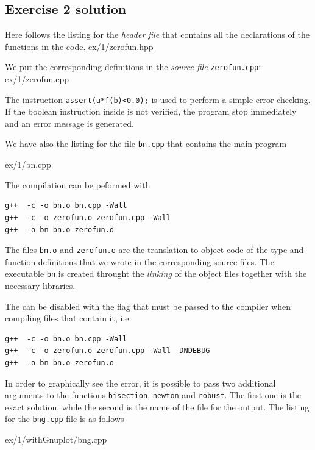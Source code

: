 \subsection*{Exercise 2 solution}

Here follows the listing for the \emph{header file} that contains all the
declarations of the functions in the code.
\lstset{basicstyle=\scriptsize\sf}
     {ex/1/zerofun.hpp}
\lstset{basicstyle=\sf}

We put the corresponding definitions in the \emph{source file}
\texttt{zerofun.cpp}:
\lstset{basicstyle=\scriptsize\sf}
     {ex/1/zerofun.cpp}
\lstset{basicstyle=\sf}

The instruction \texttt{assert(u*f(b)<0.0);} is used to perform a simple error
checking. If the boolean instruction inside is not verified, the program stop
immediately and an error message is generated.

We have also the listing for the file \texttt{bn.cpp} that contains the main
program
\lstset{basicstyle=\scriptsize\sf}
    
    {ex/1/bn.cpp}
\lstset{basicstyle=\sf}

The compilation can be peformed with
\begin{verbatim}
g++  -c -o bn.o bn.cpp -Wall
g++  -c -o zerofun.o zerofun.cpp -Wall
g++  -o bn bn.o zerofun.o
\end{verbatim}

The files \texttt{bn.o} and \texttt{zerofun.o} are the translation to object
code of the type and function definitions that we wrote in the corresponding
source files. The executable \texttt{bn} is created throught the \emph{linking}
of the object files together with the necessary libraries.

The  can be disabled with the  flag that must be
passed to the compiler when compiling files that contain it, i.e.
\begin{verbatim}
g++  -c -o bn.o bn.cpp -Wall
g++  -c -o zerofun.o zerofun.cpp -Wall -DNDEBUG
g++  -o bn bn.o zerofun.o
\end{verbatim}

In order to graphically see the error, it is possible to pass two additional
arguments to the functions  \texttt{bisection}, \texttt{newton} and
\texttt{robust}. The first one is the exact solution, while the second is the
name of the file for the output.
The listing for the \texttt{bng.cpp} file is as follows
\lstset{basicstyle=\scriptsize\sf}
    
        {ex/1/withGnuplot/bng.cpp}
\lstset{basicstyle=\sf}

